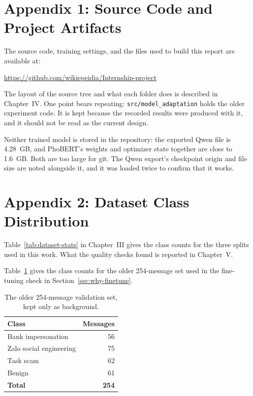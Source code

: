 
\section*{Appendix 1: Source Code and Project Artifacts}

The source code, training settings, and the files used to build this report are available at:

\begin{center}
\url{https://github.com/wikiepeidia/Internship-project}
\end{center}

The layout of the source tree and what each folder does is described in Chapter~IV. One point bears repeating: \texttt{src/model\_adaptation} holds the older experiment code. It is kept because the recorded results were produced with it, and it should not be read as the current design.

Neither trained model is stored in the repository: the exported Qwen file is 4.28~GB, and PhoBERT's weights and optimizer state together are close to 1.6~GB. Both are too large for git. The Qwen export's checkpoint origin and file size are noted alongside it, and it was loaded twice to confirm that it works.

\section*{Appendix 2: Dataset Class Distribution}

Table~\ref{tab:dataset-stats} in Chapter~III gives the class counts for the three splits used in this work. What the quality checks found is reported in Chapter~V.

Table~\ref{tab:validation-class-dist} gives the class counts for the older 254-message set used in the fine-tuning check in Section~\ref{sec:why-finetune}.

\begin{table}[H]
\centering
\caption{The older 254-message validation set, kept only as background.}
\label{tab:validation-class-dist}
\setlength{\tabcolsep}{10pt}
\renewcommand{\arraystretch}{1.3}
\begin{tabular}{lr}
\toprule
\textbf{Class} & \textbf{Messages} \\
\midrule
Bank impersonation       & 56  \\
Zalo social engineering  & 75  \\
Task scam                & 62  \\
Benign                   & 61  \\
\midrule
\textbf{Total}           & \textbf{254} \\
\bottomrule
\end{tabular}
\end{table}

